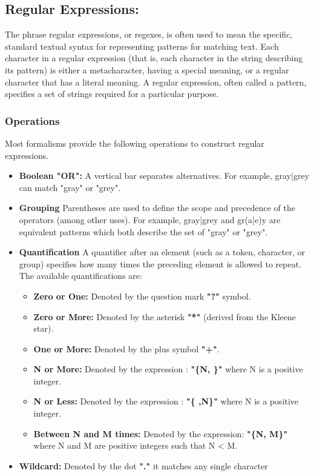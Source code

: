 \subsection{Regular Expressions:}
    The phrase regular expressions, or regexes, is often used to mean the specific, standard textual syntax for representing patterns for matching text. Each character in a regular expression (that is, each character in the string describing its pattern) is either a metacharacter, having a special meaning, or a regular character that has a literal meaning.
    A regular expression, often called a pattern, specifies a set of strings required for a particular purpose.
\subsubsection{Operations}
Most formalisms provide the following operations to construct regular expressions.
\begin{itemize}
    \item \textbf{Boolean "OR":} A vertical bar separates alternatives. For example, gray|grey can match "gray" or "grey".
    \item \textbf{Grouping} Parentheses are used to define the scope and precedence of the operators (among other uses). For example, gray|grey and gr(a|e)y are equivalent patterns which both describe the set of "gray" or "grey".
    \item \textbf{Quantification} A quantifier after an element (such as a token, character, or group) specifies how many times the preceding element is allowed to repeat.
    The available quantifications are:
    \begin{itemize}
        \item \textbf{Zero or One:} Denoted by the question mark \textbf{"?"} symbol.
        \item \textbf{Zero or More:} Denoted by the asterisk \textbf{"*"} (derived from the Kleene star).
        \item \textbf{One or More:} Denoted by the plus symbol \textbf{"+"}.
        \item \textbf{N or More:} Denoted by the expression : \textbf{"\{N, \}"} where N is a positive integer.
        \item \textbf{N or Less:} Denoted by the expression : \textbf{"\{ ,N\}"} where N is a positive integer.
        \item \textbf{Between N and M times:} Denoted by the expression: \textbf{"\{N, M\}"} where N and M are positive integers such that N < M.
    \end{itemize}
    \item \textbf{Wildcard:} Denoted by the dot \textbf{"."} it matches any single character
\end{itemize}


